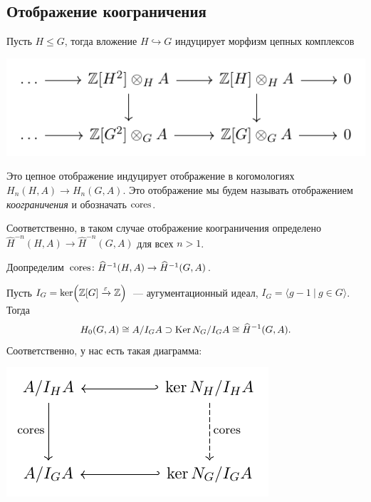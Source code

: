 	 \subsection{Отображение коограничения}

	 \begin{definition} 
	 	Пусть $H \le G$, тогда вложение $H \hookrightarrow G$ индуцирует морфизм цепных комплексов 

	 \begin{center}
	 	\includegraphics{lectures/6/pictures/cd_13.pdf}
	 \end{center}

	 Это цепное отображение индуцирует отображение в когомологиях $H_{n}(H, A) \to H_{n}(G, A)$. Это отображение мы будем называть отображением \emph{коограничения} и обозначать $\operatorname{cores}$. 
	 \end{definition}

	 Соответственно, в таком случае отображение коограничения определено $\widehat{H}^{-n}(H, A) \to \widehat{H}^{-n}(G, A)$ для всех $n > 1$. 

	 Доопределим $\operatorname{cores} \colon \widehat{H}^{-1}(H, A) \to \widehat{H}^{-1}(G, A)$. 

	 Пусть $I_{G} = \ker\lr*{\Z[G] \xrightarrow{\varepsilon} \Z}$~--- аугументационный идеал, $I_{G} = \langle g - 1 \ \vert \ g \in G \rangle$. Тогда 
	 \[
	 	H_{0}(G, A) \cong A/I_{G}A \supset \operatorname{Ker}{N_{G}}/I_{G}A \cong \widehat{H}^{-1}(G, A).
	 \]
	 Соответственно, у нас есть такая диаграмма: 

	 \begin{center}
	 	\includegraphics{lectures/6/pictures/cd_14.pdf}
	 \end{center}

